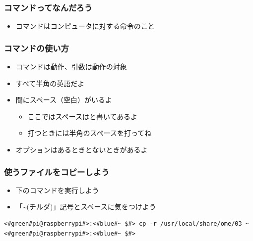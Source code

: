 \documentclass[slide03.tex]{subfiles}
\begin{document}
\begin{frame}
    \frametitle{コマンドってなんだろう}
    \begin{itemize}
        \item コマンドはコンピュータに対する命令のこと
    \end{itemize}
    \begin{figure}[h]
        \centering
        
    \end{figure}
\end{frame}

\begin{frame}
    \frametitle{コマンドの使い方}
    \begin{figure}[h]
        \centering
        
    \end{figure}
    \begin{itemize}
        \item コマンドは動作、引数は動作の対象
        \item すべて半角の英語だよ
        \item 間にスペース（空白）がいるよ
            \begin{itemize}
                \item ここではスペースは\textvisiblespace と書いてあるよ
                \item 打つときには半角のスペースを打ってね
            \end{itemize}
        \item オプションはあるときとないときがあるよ
    \end{itemize}
\end{frame}

\begin{frame}[fragile]
    \frametitle{使うファイルをコピーしよう}
    \begin{itemize}
        \item 下のコマンドを実行しよう
        \item 「\textasciitilde(チルダ)」記号とスペースに気をつけよう
    \end{itemize}
    \begin{lstlisting}[title=使うファイルのコピー,label=workfilecopy]
<#green#pi@raspberrypi#>:<#blue#~ $#> cp -r /usr/local/share/ome/03 ~
<#green#pi@raspberrypi#>:<#blue#~ $#>
    \end{lstlisting}
\end{frame}
\end{document}
